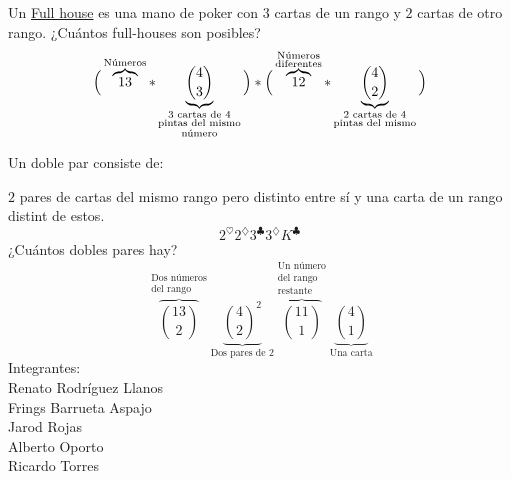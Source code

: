 \documentclass[../main.tex]{subfiles}
\begin{document}
Un \underline{Full house} es una mano de poker con $3$ cartas de un rango y $2$
cartas de otro rango.
¿Cuántos full-houses son posibles?
\[
	\Big{(}
	\overbrace{13}^{\text{Números}}
	*
	\underbrace{ \binom{4}{3} }_{\substack{\text{$3$ cartas de $4$}\\ \text{pintas del mismo}\\
	\text{número}} }
	\Big{)}
	*
	\Big{(}
	\overbrace{12}^{\substack{\text{Números}\\\text{diferentes}} }
	*
	\underbrace{ \binom{4}{2} }_{\substack{\text{$2$ cartas de $4$}\\ \text{pintas del mismo}} }
	\Big{)}
\]

Un doble par consiste de:

$2$ pares de cartas del mismo rango pero distinto entre sí y una carta de un rango
distint de estos.
\[
	2^\heartsuit2^\diamondsuit3^\clubsuit3^\diamondsuit K^\clubsuit
\]
¿Cuántos dobles pares hay?
\[
	\overbrace{ \binom{13}{2} }^{\substack{\text{Dos números}\\\text{del rango}} }
	\underbrace{ \binom{4}{2}^2 }_{\text{Dos pares de 2}}
	\overbrace{ \binom{11}{1} }^{\substack{\text{Un número}\\\text{del rango}\\\text{restante}} }
	\underbrace{ \binom{4}{1} }_{\text{Una carta}}
\]
Integrantes:\\
Renato Rodríguez Llanos\\
Frings Barrueta Aspajo\\
Jarod Rojas\\
Alberto Oporto\\
Ricardo Torres\\
\end{document}
